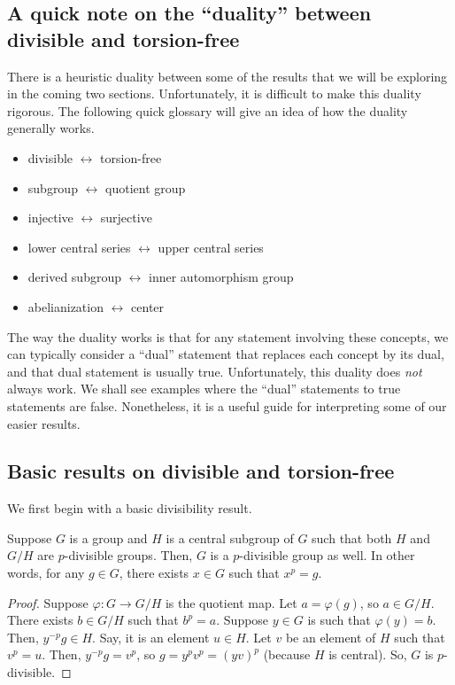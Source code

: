 \subsection*{A quick note on the ``duality'' between divisible and torsion-free}

There is a heuristic duality between some of the results that we will
be exploring in the coming two sections. Unfortunately, it is
difficult to make this duality rigorous. The following quick glossary
will give an idea of how the duality generally works.

\begin{itemize}
\item divisible $\leftrightarrow$ torsion-free
\item subgroup $\leftrightarrow$ quotient group
\item injective $\leftrightarrow$ surjective
\item lower central series $\leftrightarrow$ upper central series
\item derived subgroup $\leftrightarrow$ inner automorphism group
\item abelianization $\leftrightarrow$ center
\end{itemize}

The way the duality works is that for any statement involving these
concepts, we can typically consider a ``dual'' statement that replaces
each concept by its dual, and that dual statement is usually
true. Unfortunately, this duality does {\em not} always work. We shall
see examples where the ``dual'' statements to true statements are
false. Nonetheless, it is a useful guide for interpreting some of our
easier results.


\subsection{Basic results on divisible and torsion-free}

We first begin with a basic divisibility result.

\begin{lemma}\label{lemma:divisibility-extension-group}
  Suppose $G$ is a group and $H$ is a central subgroup of $G$ such
  that both $H$ and $G/H$ are $p$-divisible groups. Then, $G$ is a
  $p$-divisible group as well. In other words, for any $g \in G$,
  there exists $x \in G$ such that $x^p = g$.
\end{lemma}

\begin{proof}
  Suppose $\varphi:G \to G/H$ is the quotient map. Let $a =
  \varphi(g)$, so $a \in G/H$. There exists $b \in G/H$ such that $b^p
  = a$. Suppose $y \in G$ is such that $\varphi(y) = b$. Then,
  $y^{-p}g \in H$. Say, it is an element $u \in H$. Let $v$ be an
  element of $H$ such that $v^p = u$. Then, $y^{-p}g = v^p$, so $g =
  y^pv^p = (yv)^p$ (because $H$ is central). So, $G$ is $p$-divisible.
\end{proof}

